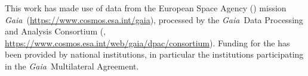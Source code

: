 \documentclass[modern]{aastex63}
\newcommand{\gaia}{\textsl{Gaia}}
\newcommand{\galah}{\acronym{GALAH}}
\newcommand{\hermes}{\acronym{HERMES}}
\begin{document}
This work has made use of data from the European Space Agency () mission
\gaia\ (\url{https://www.cosmos.esa.int/gaia}), processed by the \gaia\ Data
Processing and Analysis Consortium (,
\url{https://www.cosmos.esa.int/web/gaia/dpac/consortium}). Funding for the
has been provided by national institutions, in particular the institutions
participating in the \gaia\ Multilateral Agreement.


\end{document}
